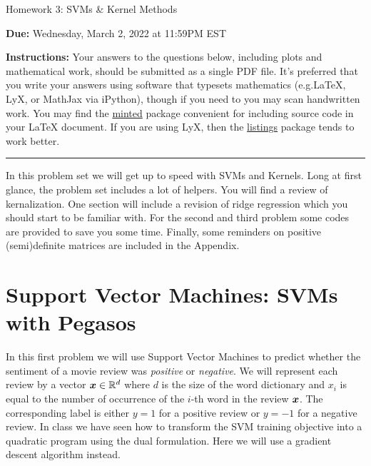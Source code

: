 \documentclass{article}
\newcommand{\wipcom}[1]{\textcolor{red}{WIP: #1}}
\newcommand{\ruleskip}{\bigskip\hrule\bigskip}
\theoremstyle{plain}
\theoremstyle{definition}
\begin{document}

\pagestyle{myheadings} 

\begin{center}
{\Large
Homework 3: SVMs \& Kernel Methods
} 
\end{center}

{
{ \color{nyupurple} \textbf{Due:} Wednesday, March 2, 2022 at 11:59PM EST} 
} 

\textbf{Instructions: }Your answers to the questions below, including plots and mathematical
 work, should be submitted as a single PDF file.  It's preferred that you write your answers using software that typesets mathematics (e.g.LaTeX, LyX, or MathJax via iPython), though if you need to you may scan handwritten work.  You may find the \href{https://github.com/gpoore/minted}{minted} package convenient for including source code in your LaTeX document.  If you are using LyX, then the \href{https://en.wikibooks.org/wiki/LaTeX/Source_Code_Listings}{listings} package tends to work better.

\ruleskip

In this problem set we will get up to speed with SVMs and Kernels. Long at first glance, the problem set includes a lot of helpers. You will find a review of kernalization. One section will include a revision of ridge regression which you should start to be familiar with. For the second and third problem some codes are provided to save you some time. Finally, some reminders on positive (semi)definite matrices are included in the Appendix.

\section{\large Support Vector Machines: SVMs with Pegasos}

In this first problem we will use Support Vector Machines to predict whether the sentiment of a movie review was \emph{positive} or \emph{negative}. We will represent each review by a vector $\boldsymbol{x} \in {\mathbb{R}}^d$ where $d$ is the size of the word dictionary and $x_i$ is equal to the number of occurrence of the $i$-th word in the review $\boldsymbol{x}$. The corresponding label is either $y=1$ for a positive review or $y=-1$ for a negative review.
In class we have seen how to transform the SVM training objective into a quadratic program using the dual formulation. Here we will use a gradient descent algorithm instead.
\end{document}
